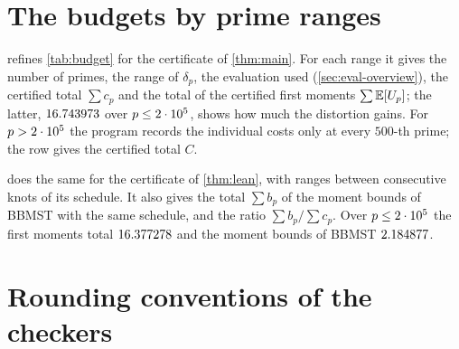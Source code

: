 \section{The budgets by prime ranges}\label{app:budget}

 refines \cref{tab:budget} for the certificate of \cref{thm:main}. For each range it gives the
number of primes, the range of $\delta_p$, the evaluation used (\cref{sec:eval-overview}), the certified total
$\sum c_p$ and the total of the certified first moments $\sum\mathbb{E}[U_p]$; the latter, $16.743973$ over $p\le2\cdot 10^{5}$,
shows how much the distortion gains. For $p>2\cdot 10^{5}$ the program records the individual costs only at every $500$-th prime;
the row gives the certified total $C$.

\begin{table}[ht]
\centering
\caption{The certified budget for $m=\Mzero$ by prime ranges (from
). All sums are rounded up in the sixth decimal.}
\label{tab:budget-main}
\small

\end{table}

 does the same for the certificate of \cref{thm:lean}, with ranges between consecutive knots
of its schedule. It also gives the total $\sum b_p$ of the moment bounds of BBMST with the same schedule, and the ratio
$\sum b_p/\sum c_p$. Over $p\le2\cdot 10^{5}$ the first moments total $16.377278$ and the moment bounds of BBMST $2.184877$.

\begin{table}[ht]
\centering
\caption{The certified budget for $m=\MzeroLean$ between consecutive knots of the schedule (from
). All sums are rounded up in the sixth decimal.}
\label{tab:budget-fine}
\small

\end{table}

\section{Rounding conventions of the checkers}\label{app:rounding}

